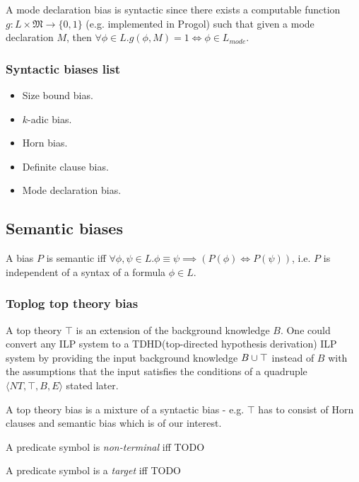 \begin{remark}
A mode declaration bias is syntactic since there exists a computable function $g:L \times \mathfrak{M} \to \{0, 1\}$ (e.g. implemented in Progol\cite{muggleton1995inverse}) such that given a mode declaration $M$, then
$\forall \phi \in L. g(\phi, M)=1 \iff \phi \in L_{mode}$.
\end{remark}

\subsubsection{Syntactic biases list}
\begin{itemize}
\item Size bound bias.
\item $k$-adic bias.
\item Horn bias.
\item Definite clause bias.
\item Mode declaration bias.
\end{itemize}

\subsection{Semantic biases}

\begin{defn}
A bias $P$ is semantic iff $\forall \phi, \psi \in L. \phi \equiv \psi \implies (P(\phi) \iff P(\psi))$, i.e. $P$ is independent of a syntax of a formula $\phi \in L$.
\end{defn}

\subsubsection{Toplog top theory bias\cite{muggleton2008toplog}}
A top theory $\top$ is an extension of the background knowledge $B$. One could convert any ILP system to a TDHD(top-directed hypothesis derivation) ILP system by providing the input background knowledge $B \cup \top$ instead of $B$ with the assumptions that the input satisfies the conditions of a quadruple $\langle NT, \top, B, E \rangle$ stated later.

A top theory bias is a mixture of a syntactic bias - e.g. $\top$ has to consist of Horn clauses and semantic bias which is of our interest.
\begin{defn}
A predicate symbol is \emph{non-terminal} iff TODO
\end{defn}

\begin{defn}
A predicate symbol is a \emph{target} iff TODO
\end{defn}

